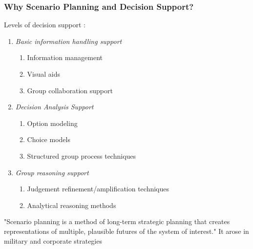 \subsubsection{Why Scenario Planning and Decision Support?}

Levels of decision support \cite{jankowskiGISGroupDecision2001}:

\begin{enumerate}[itemsep=0pt,parsep=0pt]
	\item{\textit{Basic information handling support}}
		\begin{enumerate}[itemsep=0pt,parsep=0pt,topsep=0pt, partopsep=0pt]
			\item{Information management}
			\item{Visual aids}
			\item{Group collaboration support}
		\end{enumerate}
	\item{\textit{Decision Analysis Support}}
		\begin{enumerate}[itemsep=0pt,parsep=0pt,topsep=0pt, partopsep=0pt]
			\item{Option modeling}
			\item{Choice models}
			\item{Structured group process techniques}
		\end{enumerate}
	\item{\textit{Group reasoning support}}
		\begin{enumerate}[itemsep=0pt,parsep=0pt,topsep=0pt, partopsep=0pt]
			\item{Judgement refinement/amplification techniques}
			\item{Analytical reasoning methods}
		\end{enumerate}
\end{enumerate}


"Scenario planning is a method of long-term strategic planning that creates representations of multiple, plausible futures of the system of interest." It arose in military and corporate strategies \cite{goodspeedScenarioPlanningCities2020} 

